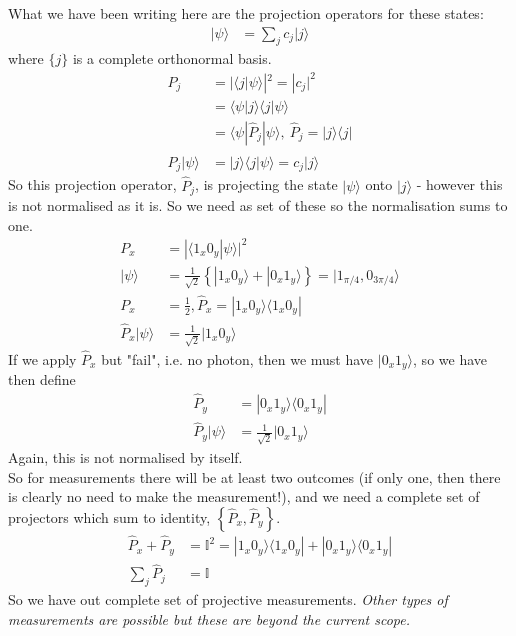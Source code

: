 \documentclass[a4paper, 11pt, normalem]{report}
\begin{document}
What we have been writing here are the projection operators for these states:
\begin{align}
    |\psi\rangle &= \sum_jc_j|j\rangle
\end{align}
where $\{j\}$ is a complete orthonormal basis.
\begin{align}
    P_j &= |\langle j|\psi\rangle|^2 = |c_j|^2 \\
        &= \langle\psi|j\rangle\langle j|\psi\rangle \\
        &= \langle\psi|\hat{P}_j|\psi\rangle,~ \hat{P}_j = |j\rangle\langle j| \\
    \hat{P}_j|\psi\rangle &= |j\rangle\langle j|\psi\rangle = c_j|j\rangle
\end{align}
So this projection operator, $\hat{P}_j$, is projecting the state $|\psi\rangle$ onto $|j\rangle$ - however this is not normalised as it is. 
So we need as set of these so the normalisation sums to one. 
\begin{align}
    P_x &= |\langle1_x0_y|\psi\rangle|^2 \\
    |\psi\rangle &= \frac{1}{\sqrt{2}}\left\{|1_x0_y\rangle+|0_x1_y\rangle\right\} = |1_{\pi/4},0_{3\pi/4}\rangle \\
    P_x &= \frac12, \hat{P}_x = |1_x0_y\rangle\langle1_x0_y| \\
    \hat{P}_x|\psi\rangle &= \frac{1}{\sqrt{2}}|1_x0_y\rangle
\end{align}
If we apply $\hat{P}_x$ but "fail", i.e. no photon, then we must have $|0_x1_y\rangle$, so we have then define
\begin{align}
    \hat{P}_y &= |0_x1_y\rangle\langle0_x1_y| \\
    \hat{P}_y|\psi\rangle &= \frac{1}{\sqrt{2}} |0_x1_y\rangle
\end{align}
Again, this is not normalised by itself. \\
So for measurements there will be at least two outcomes (if only one, then there is clearly no need to make the measurement!), and we need a complete set of projectors which sum to identity, $\left\{\hat{P}_x,\hat{P}_y\right\}$.
\begin{align}
    \hat{P}_x+\hat{P}_y &= \mathbb{I}^2 = |1_x0_y\rangle\langle1_x0_y| + |0_x1_y\rangle\langle0_x1_y| \\
    \sum_j\hat{P}_j &= \mathbb{I}
\end{align}
So we have out complete set of projective measurements. \emph{Other types of measurements are possible but these are beyond the current scope.}
\end{document}
